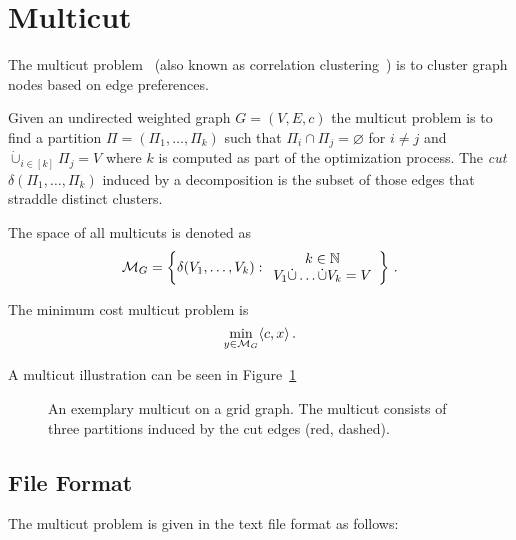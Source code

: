 \section{Multicut}
\label{sec:multicut}

The multicut problem~\cite{chopra1993partition} (also known as correlation clustering~\cite{demaine2006correlation}) is to cluster graph nodes based on edge preferences.

\begin{definition}[Multicut]

Given an undirected weighted graph $G=(V,E,c)$ the multicut problem is to find a partition $\Pi = (\Pi_1,\ldots,\Pi_k)$ such that $\Pi_i \cap \Pi_j = \varnothing$ for $i \neq j$ and $\dot{\cup}_{i\in[k]} \Pi_j = V$ where $k$ is computed as part of the optimization process.
The \emph{cut} $\delta(\Pi_1,\ldots,\Pi_k)$ induced by a decomposition is the subset of those edges that straddle distinct clusters.

The space of all multicuts is denoted as
\begin{equation}
  \mathcal{M}_G = \left\{ \delta(V_1,\ldots,V_k) : 
\begin{array}{c}
  k \in \mathbb{N} \\
  V_1 \dot\cup \ldots \dot\cup V_k = V
\end{array} \right\}\,.
\end{equation} 

The minimum cost multicut problem is
\begin{equation}
  \label{eq:multicut}
  \min_{y \in \mathcal{M}_G} \langle c, x \rangle\,.
\end{equation} 
\end{definition}

A multicut illustration can be seen in Figure~\ref{fig:multicut-illustration}

\begin{figure}[H]
    \centering
    \scalebox{0.7}{  }
    \caption{
    An exemplary multicut on a grid graph.
    The multicut consists of three partitions induced by the cut edges (red, dashed).
    }
    \label{fig:multicut-illustration}
\end{figure}

\subsection{File Format}
The multicut problem is given in the text file format as follows:

